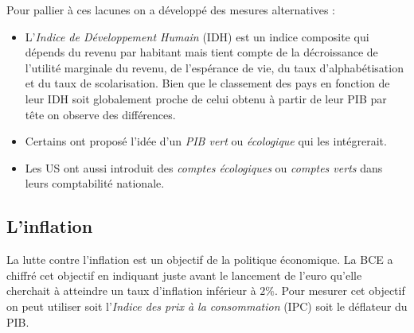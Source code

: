 \documentclass[10pt]{book}
\begin{document}
Pour pallier à ces lacunes on a développé des mesures alternatives : 
\begin{itemize}
  \item L'\textit{Indice de Développement Humain} (IDH) est un indice composite qui dépends du revenu par habitant mais tient compte de la décroissance de l'utilité marginale du revenu, de l'espérance de vie, du taux d'alphabétisation et du taux de scolarisation. Bien que le  classement des pays en fonction de leur IDH soit globalement proche de celui obtenu à partir de leur PIB par tête on observe des différences.
  \item Certains ont proposé l'idée d'un \textit{PIB vert} ou \textit{écologique} qui les intégrerait.
  \item Les US ont aussi introduit des \textit{comptes écologiques} ou \textit{comptes verts} dans leurs comptabilité nationale.
\end{itemize}

\subsection{L'inflation}
La lutte contre l'inflation est un objectif de la politique économique. La BCE a chiffré cet objectif en indiquant juste avant le lancement de l'euro qu'elle cherchait à atteindre un taux d'inflation inférieur à $2\%$. Pour mesurer cet objectif on peut utiliser soit l'\textit{Indice des prix à la consommation} (IPC) soit le déflateur du PIB.
\end{document}
